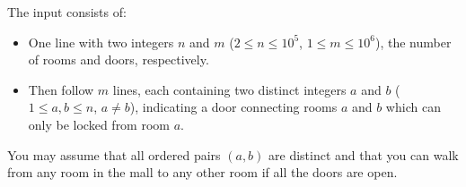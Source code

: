
    The input consists of:
    \begin{itemize}
        \item One line with two integers $n$ and $m$ ($2\leq n \leq 10^5$, $1\leq m \leq 10^6$), the number of rooms and doors, respectively.
        \item Then follow $m$ lines, each containing two distinct integers $a$ and $b$ ($1 \leq a,b \leq n$, $a \neq b$),
            indicating a door connecting rooms $a$ and $b$ which can only be locked from room
            $a$.
    \end{itemize}
    You may assume that all ordered pairs $(a,b)$ are distinct and that you can
    walk from any room in the mall to any other room if all the doors are open.
